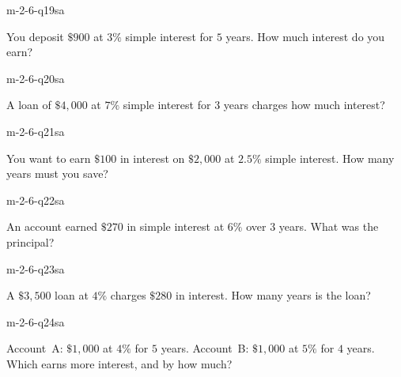 
\begin{practiceQuestion}{m-2-6-q19}{sa}
\begin{questionText}
You deposit $\$900$ at $3\%$ simple interest for $5$ years. How much interest do you earn?
\end{questionText}
\end{practiceQuestion}

\begin{practiceQuestion}{m-2-6-q20}{sa}
\begin{questionText}
A loan of $\$4{,}000$ at $7\%$ simple interest for $3$ years charges how much interest?
\end{questionText}
\end{practiceQuestion}

\begin{practiceQuestion}{m-2-6-q21}{sa}
\begin{questionText}
You want to earn $\$100$ in interest on $\$2{,}000$ at $2.5\%$ simple interest. How many years must you save?
\end{questionText}
\end{practiceQuestion}

\begin{practiceQuestion}{m-2-6-q22}{sa}
\begin{questionText}
An account earned $\$270$ in simple interest at $6\%$ over $3$ years. What was the principal?
\end{questionText}
\end{practiceQuestion}

\begin{practiceQuestion}{m-2-6-q23}{sa}
\begin{questionText}
A $\$3{,}500$ loan at $4\%$ charges $\$280$ in interest. How many years is the loan?
\end{questionText}
\end{practiceQuestion}

\begin{practiceQuestion}{m-2-6-q24}{sa}
\begin{questionText}
Account~A: $\$1{,}000$ at $4\%$ for $5$ years. Account~B: $\$1{,}000$ at $5\%$ for $4$ years. Which earns more interest, and by how much?
\end{questionText}
\end{practiceQuestion}

